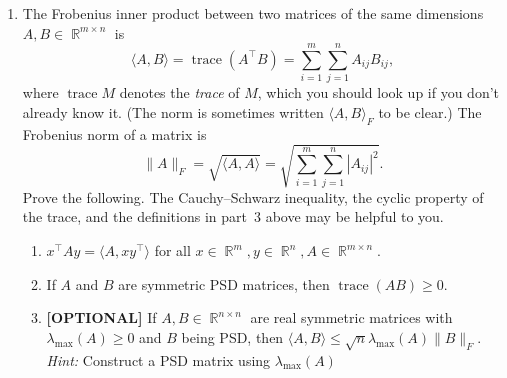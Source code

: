 \documentclass{article}
\DeclareMathOperator{\trac}{\mathrm{trace}}
\DeclareMathOperator{\R}{\mathbb{R}}
\begin{document}
\begin{enumerate}
    \item 
    The Frobenius inner product between two matrices of the same dimensions $A,B \in \R^{m \times n}$ is
    \[
        \langle A, B \rangle = \trac(A^\top B) = \sum_{i=1}^m \sum_{j=1}^n A_{ij} B_{ij},
    \]
    where $\trac M$ denotes the {\em trace} of $M$, which you should look up if you don't already know it.
    (The norm is sometimes written $\langle A, B \rangle_F$ to be clear.)
    The Frobenius norm of a matrix is
    \[
        \|A\|_F = \sqrt{\langle A, A \rangle} = \sqrt{\sum_{i=1}^m \sum_{j=1}^n |A_{ij}|^2}.
    \]
    Prove the following.
    The Cauchy--Schwarz inequality, the cyclic property of the trace, and the definitions in part~3 above may be helpful to you.
    \begin{enumerate}
        \item 
        $x^\top A y = \langle A, x y^\top \rangle$ for all $x \in \R^{m}, y \in \R^{n}, A \in \R^{m \times n}$.
        \item 
        If $A$ and $B$ are symmetric PSD matrices, then $\trac(AB)\geq 0$.
        \item 
        \textbf{[OPTIONAL]} If $A,B \in \R^{n \times n}$ are real symmetric matrices with $\lambda_{\max}(A) \geq 0$ and $B$ being PSD, then $\langle A, B \rangle \leq \sqrt n \lambda_{\max}(A) \|B\|_F$. \\
        \emph{Hint:} Construct a PSD matrix using $\lambda_{\max}(A)$
    \end{enumerate}
    

\end{enumerate}
\end{document}
